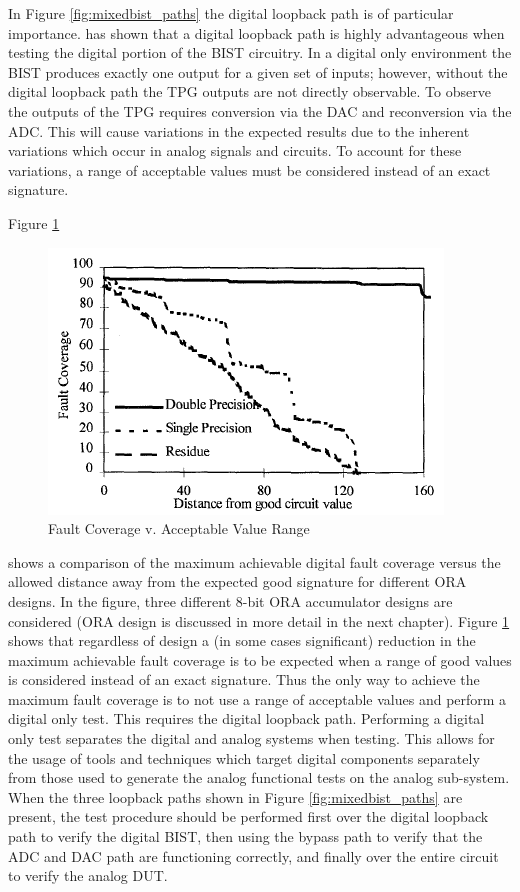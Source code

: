 \documentclass[12pt]{report}
\begin{document}
In Figure \ref{fig:mixedbist_paths} the digital loopback path is of particular importance.  \cite{stroud-analog} has shown that a digital loopback path is highly advantageous when testing the digital portion of the BIST circuitry.  In a digital only environment the BIST produces exactly one output for a given set of inputs; however, without the digital loopback path the TPG outputs are not directly observable.  To observe the outputs of the TPG requires conversion via the DAC and reconversion via the ADC.  This will cause variations in the expected results due to the inherent variations which occur in analog signals and circuits.   To account for these variations, a range of acceptable values must be considered instead of an exact signature\cite{stroud-analog}.  

Figure \ref{fig:analog-faultcvg}
\begin{figure}
	\begin{center}
		\includegraphics[scale=.7]{images/analog-fault-coverage}
	\end{center}
	\caption{Fault Coverage v. Acceptable Value Range\cite{stroud-analog}}
	\label{fig:analog-faultcvg}
\end{figure}
shows a comparison of the maximum achievable digital fault coverage versus the allowed distance away from the expected good signature for different ORA designs.  In the figure, three different 8-bit ORA accumulator designs are considered  (ORA design is discussed in more detail in the next chapter).   Figure \ref{fig:analog-faultcvg} shows that regardless of design a (in some cases significant) reduction in the maximum achievable fault coverage is to be expected when a range of good values is considered instead of an exact signature.  Thus the only way to achieve the maximum fault coverage is to not use a range of acceptable values and perform a digital only test.  This requires the digital loopback path\cite{stroud-analog}.  Performing a digital only test separates the digital and analog systems when testing.  This allows for the usage of tools and techniques which target digital components separately from those used to generate the analog functional tests on the analog sub-system\cite{stroud-analog}.  When the three loopback paths shown in Figure \ref{fig:mixedbist_paths} are present, the test procedure should be performed first over the digital loopback path to verify the digital BIST, then using the bypass path to verify that the ADC and DAC path are functioning correctly, and finally over the entire circuit to verify the analog DUT\cite{syschip}\cite{stroud-analog}.
\end{document}
